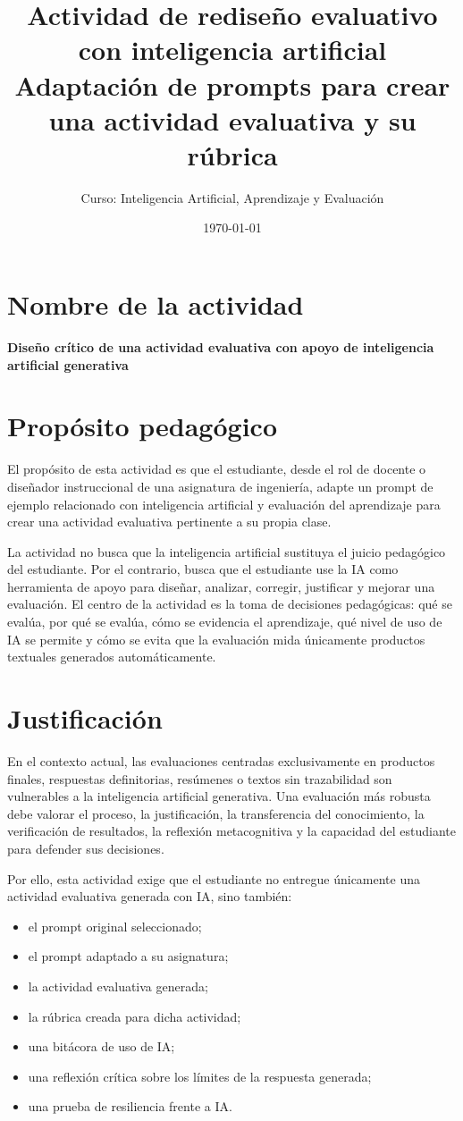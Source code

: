 \documentclass[12pt,letterpaper]{article}
\title{\textbf{Actividad de rediseño evaluativo con inteligencia artificial}\\
\large Adaptación de prompts para crear una actividad evaluativa y su rúbrica}
\author{Curso: Inteligencia Artificial, Aprendizaje y Evaluación}
\date{\today}
\begin{document}
\maketitle

\section{Nombre de la actividad}

\textbf{Diseño crítico de una actividad evaluativa con apoyo de
inteligencia artificial generativa}

\section{Propósito pedagógico}

El propósito de esta actividad es que el estudiante, desde el rol de
docente o diseñador instruccional de una asignatura de ingeniería,
adapte un prompt de ejemplo relacionado con inteligencia artificial y
evaluación del aprendizaje para crear una actividad evaluativa
pertinente a su propia clase.

La actividad no busca que la inteligencia artificial sustituya el
juicio pedagógico del estudiante. Por el contrario, busca que el
estudiante use la IA como herramienta de apoyo para diseñar,
analizar, corregir, justificar y mejorar una evaluación. El centro de
la actividad es la toma de decisiones pedagógicas: qué se evalúa, por
qué se evalúa, cómo se evidencia el aprendizaje, qué nivel de uso de
IA se permite y cómo se evita que la evaluación mida únicamente
productos textuales generados automáticamente.

\section{Justificación}

En el contexto actual, las evaluaciones centradas exclusivamente en
productos finales, respuestas definitorias, resúmenes o textos sin
trazabilidad son vulnerables a la inteligencia artificial generativa.
Una evaluación más robusta debe valorar el proceso, la justificación,
la transferencia del conocimiento, la verificación de resultados, la
reflexión metacognitiva y la capacidad del estudiante para defender
sus decisiones.

Por ello, esta actividad exige que el estudiante no entregue
únicamente una actividad evaluativa generada con IA, sino también:

\begin{itemize}
  \item el prompt original seleccionado;
  \item el prompt adaptado a su asignatura;
  \item la actividad evaluativa generada;
  \item la rúbrica creada para dicha actividad;
  \item una bitácora de uso de IA;
  \item una reflexión crítica sobre los límites de la respuesta generada;
  \item una prueba de resiliencia frente a IA.
\end{itemize}
\end{document}
